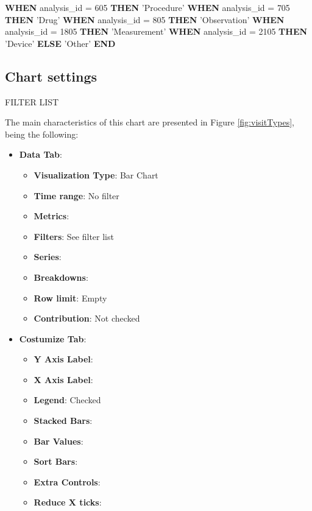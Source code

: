\documentclass[]{book}
\newenvironment{Shaded}{\begin{snugshade}}{\end{snugshade}}
\newcommand{\KeywordTok}[1]{\textcolor[rgb]{0.13,0.29,0.53}{\textbf{#1}}}
\newcommand{\DecValTok}[1]{\textcolor[rgb]{0.00,0.00,0.81}{#1}}
\newcommand{\StringTok}[1]{\textcolor[rgb]{0.31,0.60,0.02}{#1}}
\newcommand{\NormalTok}[1]{#1}
\providecommand{\tightlist}{%
  \setlength{\itemsep}{0pt}\setlength{\parskip}{0pt}}
\begin{document}
\begin{Shaded}
\begin{Highlighting}[]
    \KeywordTok{WHEN}\NormalTok{ analysis_id = }\DecValTok{605} \KeywordTok{THEN} \StringTok{'Procedure'}
    \KeywordTok{WHEN}\NormalTok{ analysis_id = }\DecValTok{705} \KeywordTok{THEN} \StringTok{'Drug'}
    \KeywordTok{WHEN}\NormalTok{ analysis_id = }\DecValTok{805} \KeywordTok{THEN} \StringTok{'Observation'}
    \KeywordTok{WHEN}\NormalTok{ analysis_id = }\DecValTok{1805} \KeywordTok{THEN} \StringTok{'Measurement'}
    \KeywordTok{WHEN}\NormalTok{ analysis_id = }\DecValTok{2105} \KeywordTok{THEN} \StringTok{'Device'}
    \KeywordTok{ELSE} \StringTok{'Other'} \KeywordTok{END}
\end{Highlighting}
\end{Shaded}

\subsection{Chart settings}\label{chart-settings-16}

FILTER LIST

The main characteristics of this chart are presented in Figure
\ref{fig:visitTypes}, being the following:

\begin{itemize}
\tightlist
\item
  \textbf{Data Tab}:

  \begin{itemize}
  \tightlist
  \item
    \textbf{Visualization Type}: Bar Chart
  \item
    \textbf{Time range}: No filter
  \item
    \textbf{Metrics}:
  \item
    \textbf{Filters}: See filter list
  \item
    \textbf{Series}:
  \item
    \textbf{Breakdowns}:
  \item
    \textbf{Row limit}: Empty
  \item
    \textbf{Contribution}: Not checked
  \end{itemize}
\item
  \textbf{Costumize Tab}:

  \begin{itemize}
  \tightlist
  \item
    \textbf{Y Axis Label}:
  \item
    \textbf{X Axis Label}:
  \item
    \textbf{Legend}: Checked
  \item
    \textbf{Stacked Bars}:
  \item
    \textbf{Bar Values}:
  \item
    \textbf{Sort Bars}:
  \item
    \textbf{Extra Controls}:
  \item
    \textbf{Reduce X ticks}:
  \end{itemize}
\end{itemize}
\end{document}
